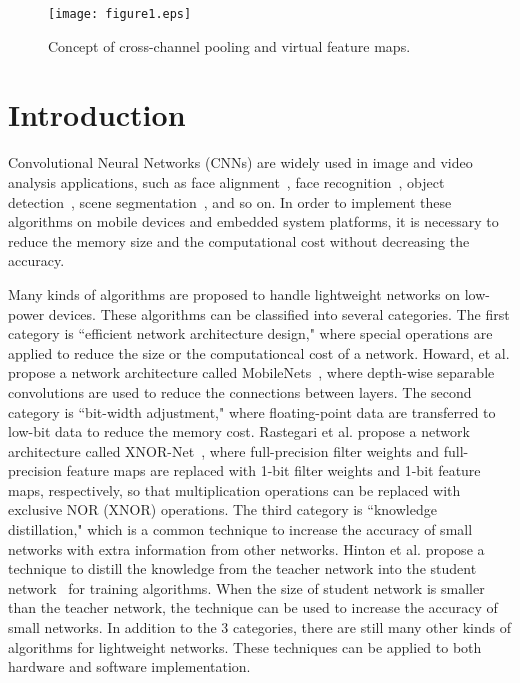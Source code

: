 \documentclass[10pt,twocolumn,letterpaper]{article}
\begin{document}
\begin{figure*}[h]
\begin{center}
\texttt{[image: figure1.eps]}
\end{center}
   \caption{Concept of cross-channel pooling and virtual feature maps.}
\label{fig:concept}
\end{figure*}

\section{Introduction}
\label{sec:introduction}

Convolutional Neural Networks (CNNs) are widely used in image and video analysis applications, such as face alignment~\cite{Zhang16}, face recognition~\cite{Sun15}, object detection~\cite{Redmon17,Ren15}, scene segmentation~\cite{Chen17,Garcia17}, and so on. In order to implement these algorithms on mobile devices and embedded system platforms, it is necessary to reduce the memory size and the computational cost without decreasing the accuracy.

Many kinds of algorithms are proposed to handle lightweight networks on low-power devices. These algorithms can be classified into several categories. The first category is ``efficient network architecture design," where special operations are applied to reduce the size or the computationcal cost of a network. Howard, et al. propose a network architecture called MobileNets~\cite{Howard17,Sandler18}, where depth-wise separable convolutions are used to reduce the connections between layers. The second category is ``bit-width adjustment," where floating-point data are transferred to low-bit data to reduce the memory cost. Rastegari et al. propose a network architecture called XNOR-Net~\cite{Rastegari16}, where full-precision filter weights and full-precision feature maps are replaced with 1-bit filter weights and 1-bit feature maps, respectively, so that multiplication operations can be replaced with exclusive NOR (XNOR) operations. The third category is ``knowledge distillation," which is a common technique to increase the accuracy of small networks with extra information from other networks. Hinton et al. propose a technique to distill the knowledge from the teacher network into the student network~\cite{Hinton15} for training algorithms. When the size of student network is smaller than the teacher network, the technique can be used to increase the accuracy of small networks. In addition to the 3 categories, there are still many other kinds of algorithms for lightweight networks. These techniques can be applied to both hardware and software implementation.
\end{document}
